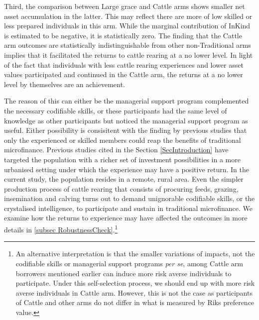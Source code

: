 	Third, the comparison between \textsf{Large grace} and \textsf{Cattle} arms shows smaller net asset accumulation in the latter. This may reflect there are more of low skilled or less prepared individuals in this arm. While the marginal contribution of \textsf{InKind} is estimated to be negative, it is statistically zero. The finding that the \textsf{Cattle} arm outcomes are statistically indistinguishable from other non-\textsf{Traditional} arms implies that it facilitated the returns to cattle rearing at a no lower level. In light of the fact that individuals with less cattle rearing experiences and lower asset values participated and continued in the \textsf{Cattle} arm, the returns at a no lower level by themselves are an achievement. %

	The reason of this can either be the managerial support program complemented the necessary codifiable skills, or these participants had the same level of knowledge as other participants but noticed the managerial support program as useful. Either possibility is consisitent with the finding by previous studies that only the experienced or skilled members could reap the benefits of traditional microfinance. Previous studies cited in the Section \ref{SecIntroduction} have targeted the population with a richer set of investment possibilities in a more urbanised setting under which the experience may have a positive return. In the current study, the population resides in a remote, rural area. Even the simpler production process of cattle rearing that consists of procuring feeds, grazing, insemination and calving turns out to demand unignorable codifiable skills, or the crystalised intelligence, to participate and sustain in traditional microfinance. We examine how the returns to experience may have affected the outcomes in more details in \ref{subsec RobustnessCheck}.\footnote{An alternative interpretation is that the smaller variations of impacts, not the codifiable skills or managerial support programs \textit{per se}, among \textsf{Cattle} arm borrowers mentioned earlier can induce more risk averse individuals to participate. Under this self-selection process, we should end up with more risk averse individuals in \textsf{Cattle} arm. However, this is not the case as participants of \textsf{Cattle} and other arms do not differ in what is measured by \textsf{Riks preference value}. }

